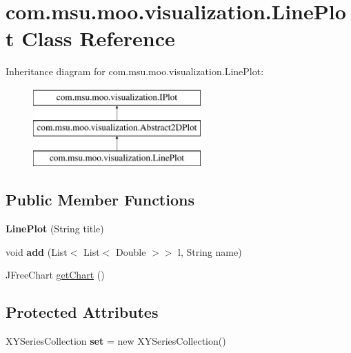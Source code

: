\hypertarget{classcom_1_1msu_1_1moo_1_1visualization_1_1LinePlot}{\section{com.\-msu.\-moo.\-visualization.\-Line\-Plot Class Reference}
\label{classcom_1_1msu_1_1moo_1_1visualization_1_1LinePlot}
}
Inheritance diagram for com.\-msu.\-moo.\-visualization.\-Line\-Plot\-:\begin{figure}[H]
\begin{center}
\leavevmode
\includegraphics[height=3.000000cm]{classcom_1_1msu_1_1moo_1_1visualization_1_1LinePlot}
\end{center}
\end{figure}
\subsection*{Public Member Functions}
\begin{DoxyCompactItemize}
\item 
\hypertarget{classcom_1_1msu_1_1moo_1_1visualization_1_1LinePlot_a0942321b06078b0658d72150b94edb68}{{\bfseries Line\-Plot} (String title)}\label{classcom_1_1msu_1_1moo_1_1visualization_1_1LinePlot_a0942321b06078b0658d72150b94edb68}

\item 
\hypertarget{classcom_1_1msu_1_1moo_1_1visualization_1_1LinePlot_a15588aebe9683b1338de9b79b6d88caa}{void {\bfseries add} (List$<$ List$<$ Double $>$$>$ l, String name)}\label{classcom_1_1msu_1_1moo_1_1visualization_1_1LinePlot_a15588aebe9683b1338de9b79b6d88caa}

\item 
J\-Free\-Chart \hyperlink{classcom_1_1msu_1_1moo_1_1visualization_1_1LinePlot_ab6bc90e83277d08e59c3efd82e3b585d}{get\-Chart} ()
\end{DoxyCompactItemize}
\subsection*{Protected Attributes}
\begin{DoxyCompactItemize}
\item 
\hypertarget{classcom_1_1msu_1_1moo_1_1visualization_1_1LinePlot_ab718a71f3ea42c7811f8f25dd2b2fd3b}{X\-Y\-Series\-Collection {\bfseries set} = new X\-Y\-Series\-Collection()}\label{classcom_1_1msu_1_1moo_1_1visualization_1_1LinePlot_ab718a71f3ea42c7811f8f25dd2b2fd3b}

\end{DoxyCompactItemize}


